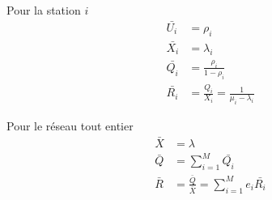 \documentclass[french]{scrartcl}
\begin{document}
\begin{multicols}{3}
{\begin{minipage}[t]{0.48\columnwidth}
	Pour la station $i$
	\begin{align*}
	\bar{U_{i}} & =\rho_{i}\\
	\bar{X_{i}} & =\lambda_{i}\\
	\bar{Q_{i}} & =\frac{\rho_{i}}{1-\rho_{i}}\\
	\bar{R_{i}} & =\frac{Q_{i}}{X_{i}}=\frac{1}{\mu_{i}-\lambda_{i}}
	\end{align*}
\end{minipage}
\quad\vrule\quad
\begin{minipage}[t]{0.48\columnwidth}
	Pour le réseau tout entier
	\begin{align*}
	\bar{X} & =\lambda\\
	\bar{Q} & =\sum_{i=1}^{M}\bar{Q_{i}}\\
	\bar{R} & =\frac{\bar{Q}}{\bar{X}}=\sum_{i=1}^{M}e_{i}\bar{R_{i}}
	\end{align*}
\end{minipage}
}
\end{multicols}
\end{document}
